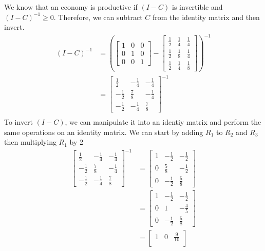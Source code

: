 \documentclass[11pt, letterpaper, twoside]{article}
\begin{document}
\begin{enumerate}
We know that an economy is productive if $(I-C)$ is invertible and $(I-C)^{-1}\geq 0$. Therefore, we can subtract $C$ from the identity matrix and then invert.
\begin{align*}
(I-C)^{-1} &=\left(\begin{bmatrix}
1 & 0 & 0\\
0 & 1 & 0\\
0 & 0 & 1
\end{bmatrix} - \begin{bmatrix}
\frac{1}{2} & \frac{1}{4} & \frac{1}{4}\\
\frac{1}{2} & \frac{1}{8} & \frac{1}{4}\\
\frac{1}{2} & \frac{1}{4} & \frac{1}{8}
\end{bmatrix}\right)^{-1}\\
&=\begin{bmatrix}
\frac{1}{2} & -\frac{1}{4} & -\frac{1}{4}\\
-\frac{1}{2} & \frac{7}{8} & -\frac{1}{4}\\
-\frac{1}{2} & -\frac{1}{4} & \frac{7}{8}
\end{bmatrix}^{-1}\\
\end{align*}
To invert $(I-C)$, we can manipulate it into an identiy matrix and perform the same operations on an identity matrix. We can start by adding $R_1$ to $R_2$ and $R_3$ then multiplying $R_1$ by 2
\begin{align*}
\begin{bmatrix}
\frac{1}{2} & -\frac{1}{4} & -\frac{1}{4}\\
-\frac{1}{2} & \frac{7}{8} & -\frac{1}{4}\\
-\frac{1}{2} & -\frac{1}{4} & \frac{7}{8}
\end{bmatrix}^{-1}&=
\begin{bmatrix}
1 & -\frac{1}{2} & -\frac{1}{2}\\
0 & \frac{5}{8} & -\frac{1}{2}\\
0 & -\frac{1}{2} & \frac{5}{8}
\end{bmatrix}\\
&= \begin{bmatrix}
1 & -\frac{1}{2} & -\frac{1}{2}\\
0 & 1 & -\frac{4}{5}\\
0 & -\frac{1}{2} & \frac{5}{8}
\end{bmatrix}\\
&= \begin{bmatrix}
1 & 0 & \frac{9}{10}\\

\end{bmatrix}
\end{align*}
\end{enumerate}
\end{document}
